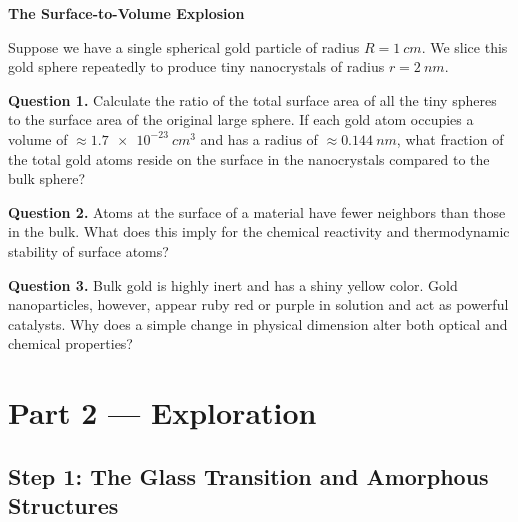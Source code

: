 \documentclass[12pt, a4paper]{book}
\begin{document}
\begin{puzzlebox}
\textbf{The Surface-to-Volume Explosion}

Suppose we have a single spherical gold particle of radius $R = \SI{1}{cm}$. We slice this gold sphere repeatedly to produce tiny nanocrystals of radius $r = \SI{2}{nm}$.

\medskip
\begin{center}
\end{center}

\medskip
\textbf{Question 1.} Calculate the ratio of the total surface area of all the tiny spheres to the surface area of the original large sphere. If each gold atom occupies a volume of $\approx \SI{1.7e-23}{cm^3}$ and has a radius of $\approx \SI{0.144}{nm}$, what fraction of the total gold atoms reside on the surface in the nanocrystals compared to the bulk sphere?

\textbf{Question 2.} Atoms at the surface of a material have fewer neighbors than those in the bulk. What does this imply for the chemical reactivity and thermodynamic stability of surface atoms?

\textbf{Question 3.} Bulk gold is highly inert and has a shiny yellow color. Gold nanoparticles, however, appear ruby red or purple in solution and act as powerful catalysts. Why does a simple change in physical dimension alter both optical and chemical properties?
\end{puzzlebox}

\newpage

\section{Part 2 --- Exploration}

\subsection{Step 1: The Glass Transition and Amorphous Structures}
\end{document}
